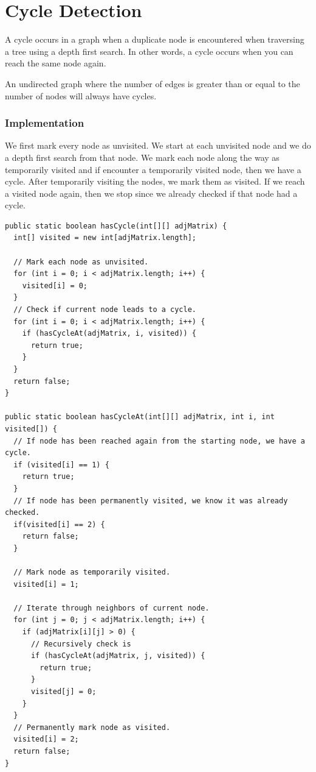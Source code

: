 \documentclass[11pt,oneside]{book}
\begin{document}
    \chapter{ Cycle Detection }
    

A cycle occurs in a graph when a duplicate node is encountered when traversing a tree using a depth first search. In other words, a cycle occurs when you can reach the same node again.

An undirected graph where the number of edges is greater than or equal to the number of nodes will always have cycles.

\subsection{Implementation}

We first mark every node as unvisited. We start at each unvisited node and we do a depth first search from that node. We mark each node along the way as temporarily visited and if encounter a temporarily visited node, then we have a cycle. After temporarily visiting the nodes, we mark them as visited. If we reach a visited node again, then we stop since we already checked if that node had a cycle.

\begin{lstlisting}
public static boolean hasCycle(int[][] adjMatrix) {
  int[] visited = new int[adjMatrix.length];
  
  // Mark each node as unvisited.
  for (int i = 0; i < adjMatrix.length; i++) {
    visited[i] = 0;
  }
  // Check if current node leads to a cycle.
  for (int i = 0; i < adjMatrix.length; i++) {
    if (hasCycleAt(adjMatrix, i, visited)) {
      return true;
    }
  }
  return false;
}

public static boolean hasCycleAt(int[][] adjMatrix, int i, int visited[]) {
  // If node has been reached again from the starting node, we have a cycle.
  if (visited[i] == 1) {
    return true;
  }
  // If node has been permanently visited, we know it was already checked.
  if(visited[i] == 2) {
    return false;
  }
  
  // Mark node as temporarily visited.
  visited[i] = 1;
  
  // Iterate through neighbors of current node.
  for (int j = 0; j < adjMatrix.length; i++) {
    if (adjMatrix[i][j] > 0) {
      // Recursively check is 
      if (hasCycleAt(adjMatrix, j, visited)) {
        return true;
      }
      visited[j] = 0;
    }
  }
  // Permanently mark node as visited.
  visited[i] = 2;
  return false;
}
\end{lstlisting}
\end{document}
